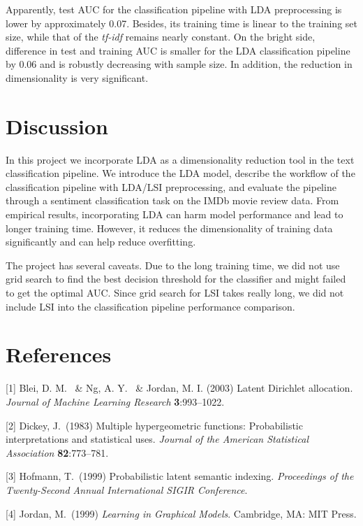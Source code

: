 \documentclass{article}
\begin{document}
Apparently, test AUC for the classification pipeline with LDA preprocessing is lower by approximately 0.07. Besides, its training time is linear to the training set size, while that of the \emph{tf-idf} remains nearly constant. On the bright side, difference in test and training AUC is smaller for the LDA classification pipeline by 0.06 and is robustly decreasing with sample size. In addition, the reduction in dimensionality is very significant.

\section{Discussion}
\label{discussion}

In this project we incorporate LDA as a dimensionality reduction tool in the text classification pipeline. We introduce the LDA model, describe the workflow of the classification pipeline with LDA/LSI preprocessing, and evaluate the pipeline through a sentiment classification task on the IMDb movie review data. From empirical results, incorporating LDA can harm model performance and lead to longer training time. However, it reduces the dimensionality of training data significantly and can help reduce overfitting.   

The project has several caveats. Due to the long training time, we did not use grid search to find the best decision threshold for the classifier and might failed to get the optimal AUC. Since grid search for LSI takes really long, we did not include LSI into the classification pipeline performance comparison.

\clearpage

\section*{References}
\medskip

\small

[1] Blei, D. M. \ \& Ng, A. Y. \ \& Jordan, M. I. (2003) Latent Dirichlet allocation. {\it Journal of Machine Learning Research} {\bf 3}:993–1022.

[2] Dickey, J.\ (1983) Multiple hypergeometric functions: Probabilistic interpretations and statistical uses. {\it Journal of the American Statistical Association} {\bf 82}:773–781.

[3] Hofmann, T.\ (1999) Probabilistic latent semantic indexing. {\it Proceedings of the Twenty-Second Annual International SIGIR Conference}.

[4] Jordan, M.\ (1999) {\it Learning in Graphical Models}. Cambridge, MA: MIT Press.
\end{document}
